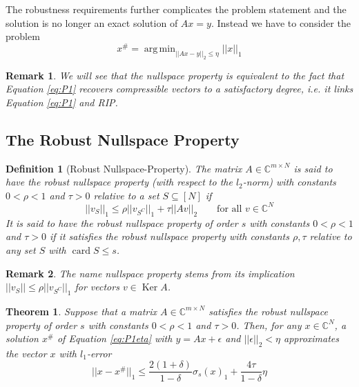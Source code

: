\documentclass[10pt,a4paper]{article}
\theoremstyle{thmstyle}
\newtheorem{definition}{Definition}
\newtheorem{theorem}{Theorem}
\newtheorem{remark}{Remark}
\DeclareMathOperator{\Ker}{Ker}
\DeclareMathOperator{\card}{card}
\DeclareMathOperator{\argmin}{arg\,min}
\begin{document}
The robustness requirements further complicates the problem statement and the solution is no longer an exact solution of $Ax = y$.
Instead we have to consider the problem
\begin{equation}
  x^{\#} = \argmin_{||Ax - y||_{2} \le \eta} ||x||_{1} \label{eq:P1eta}
\end{equation}

\begin{remark}
  We will see that the nullspace property is equivalent to the fact that Equation \eqref{eq:P1} recovers compressible vectors to a satisfactory degree, i.e. it links Equation \eqref{eq:P1} and RIP.
\end{remark}

\subsection{The Robust Nullspace Property}

\begin{definition}[Robust Nullspace-Property]
  The matrix $A \in \mathbb{C}^{m \times N}$ is said to have the \emph{robust nullspace property} (with respect to the $l_{2}$-norm) with constants $0 < \rho < 1$ and $\tau > 0$ relative to a set $S \subseteq [N]$ if
  \begin{equation*}
    ||v_{S}||_{1} \le \rho||v_{S^{C}}||_{1} + \tau ||Av||_{2} \qquad \text{for all $v \in \mathbb{C}^{N}$}
  \end{equation*}
  It is said to have the \emph{robust nullspace property of order $s$} with constants $0 < \rho < 1$ and $\tau > 0$ if it satisfies the robust nullspace property with constants $\rho, \tau$ relative to any set $S$ with $\card S \le s$.
\end{definition}

\begin{remark}
  The name nullspace property stems from its implication $||v_{S}|| \le \rho||v_{S^{C}}||_{1}$ for vectors $v \in \Ker A$.
\end{remark}

\begin{theorem}
  Suppose that a matrix $A \in \mathbb{C}^{m \times N}$ satisfies the robust nullspace property of order $s$ with constants $0 < \rho < 1$ and $\tau > 0$.
  Then, for any $x \in \mathbb{C}^{N}$, a solution $x^{\#}$ of Equation \eqref{eq:P1eta} with $y = Ax + \epsilon$ and $||\epsilon||_{2} < \eta$ approximates the vector $x$ with $l_{1}$-error
  \begin{equation*}
    ||x - x^{\#}||_{1} \le \frac{2(1 + \delta)}{1 - \delta}\sigma_{s}(x)_{1} + \frac{4\tau}{1 - \delta}\eta
  \end{equation*}
\end{theorem}
\end{document}

